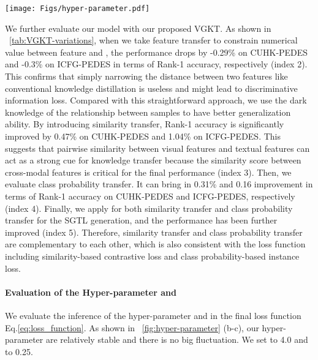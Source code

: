 \begin{figure*}[t]
	\centering
	\texttt{[image: Figs/hyper-parameter.pdf]}
	\caption{\small{Effects of three hyper-parameters, group number ,  weight , and  weight  on CUHK-PEDES and ICFG-PEDES datasets in terms of Rank-1 accuracy. 
}}
	\label{fig:hyper-parameter}
\end{figure*}

We further evaluate our model with our proposed VGKT. As shown in \tablename~\ref{tab:VGKT-variations}, when we take feature transfer to constrain numerical value between feature  and , the performance drops by -0.29\% on CUHK-PEDES and -0.3\% on ICFG-PEDES in terms of Rank-1 accuracy, respectively (index 2). This confirms that simply narrowing the distance between two features like 
conventional knowledge distillation is useless and might lead to discriminative information loss. 
Compared with this straightforward approach, we use the dark knowledge of the relationship between samples to have better generalization ability.
By introducing similarity transfer, Rank-1 accuracy is significantly improved by 0.47\% on CUHK-PEDES and 1.04\% on ICFG-PEDES. This suggests that pairwise similarity between visual features and textual features can act as a strong cue for knowledge transfer because the similarity score between cross-modal features is critical for the final performance (index 3).
Then, we evaluate class probability transfer. It can bring in 0.31\% and 0.16 improvement in terms of Rank-1 accuracy on CUHK-PEDES and ICFG-PEDES, respectively (index 4). 
Finally, we apply for both similarity transfer and class probability transfer for the SGTL generation, and the performance has been further improved (index 5).
Therefore, similarity transfer and class probability transfer are complementary to each other, which is also consistent with the loss function including similarity-based contrastive loss and class probability-based instance loss.

\paragraph{Evaluation of the Hyper-parameter  and }
We evaluate the inference of the hyper-parameter  and  in the final loss function Eq.\ref{eq:loss_function}. As shown in \figurename~\ref{fig:hyper-parameter} (b-c), our hyper-parameter are relatively stable and there is no big fluctuation. We set  to 4.0 and  to 0.25. 







